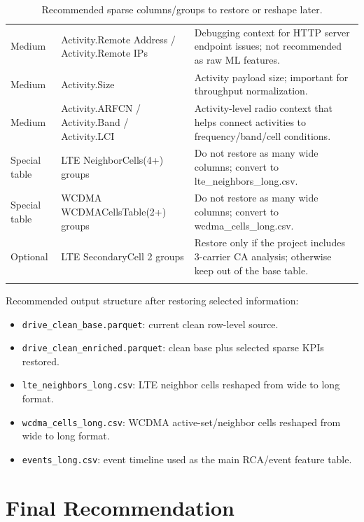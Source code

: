 \documentclass[12pt,a4paper]{article}
\begin{document}
\begin{longtable}{P{2.2cm}P{5.2cm}P{7.1cm}}
Medium & {\ttfamily Activity.\allowbreak{}Remote Address /\allowbreak{} Activity.\allowbreak{}Remote IPs} & Debugging context for HTTP server endpoint issues; not recommended as raw ML features. \\
Medium & {\ttfamily Activity.\allowbreak{}Size} & Activity payload size; important for throughput normalization. \\
Medium & {\ttfamily Activity.\allowbreak{}ARFCN /\allowbreak{} Activity.\allowbreak{}Band /\allowbreak{} Activity.\allowbreak{}LCI} & Activity-level radio context that helps connect activities to frequency/band/cell conditions. \\
Special table & {\ttfamily LTE NeighborCells(4+) groups} & Do not restore as many wide columns; convert to lte\_neighbors\_long.csv. \\
Special table & {\ttfamily WCDMA WCDMACellsTable(2+) groups} & Do not restore as many wide columns; convert to wcdma\_cells\_long.csv. \\
Optional & {\ttfamily LTE SecondaryCell 2 groups} & Restore only if the project includes 3-carrier CA analysis; otherwise keep out of the base table. \\
\bottomrule
\caption{Recommended sparse columns/groups to restore or reshape later.}
\end{longtable}

Recommended output structure after restoring selected information:
\begin{itemize}
    \item \texttt{drive\_clean\_base.parquet}: current clean row-level source.
    \item \texttt{drive\_clean\_enriched.parquet}: clean base plus selected sparse KPIs restored.
    \item \texttt{lte\_neighbors\_long.csv}: LTE neighbor cells reshaped from wide to long format.
    \item \texttt{wcdma\_cells\_long.csv}: WCDMA active-set/neighbor cells reshaped from wide to long format.
    \item \texttt{events\_long.csv}: event timeline used as the main RCA/event feature table.
\end{itemize}


\section{Final Recommendation}
\end{document}
